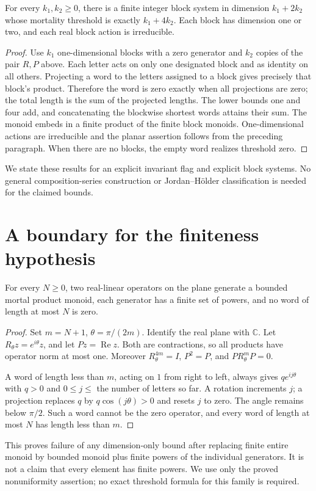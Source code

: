 \begin{proposition}\label{prop:sharpflags}
For every \(k_1,k_2\geq0\), there is a finite integer block system in dimension \(k_1+2k_2\) whose mortality threshold is exactly \(k_1+4k_2\). Each block has dimension one or two, and each real block action is irreducible.
\end{proposition}
\begin{proof}
Use \(k_1\) one-dimensional blocks with a zero generator and \(k_2\) copies of the pair \(R,P\) above. Each letter acts on only one designated block and as identity on all others. Projecting a word to the letters assigned to a block gives precisely that block's product. Therefore the word is zero exactly when all projections are zero; the total length is the sum of the projected lengths. The lower bounds one and four add, and concatenating the blockwise shortest words attains their sum. The monoid embeds in a finite product of the finite block monoids. One-dimensional actions are irreducible and the planar assertion follows from the preceding paragraph. When there are no blocks, the empty word realizes threshold zero.
\end{proof}
We state these results for an explicit invariant flag and explicit block systems. No general composition-series construction or Jordan--H\"older classification is needed for the claimed bounds.

\section{A boundary for the finiteness hypothesis}\label{sec:boundary}
\begin{proposition}\label{prop:boundary}
For every \(N\geq0\), two real-linear operators on the plane generate a bounded mortal product monoid, each generator has a finite set of powers, and no word of length at most \(N\) is zero.
\end{proposition}
\begin{proof}
Set \(m=N+1\), \(\theta=\pi/(2m)\). Identify the real plane with \(\mathbb C\). Let \(R_\theta z=e^{i\theta}z\), and let \(Pz=\operatorname{Re}z\). Both are contractions, so all products have operator norm at most one. Moreover \(R_\theta^{4m}=I\), \(P^2=P\), and \(PR_\theta^mP=0\).

A word of length less than \(m\), acting on \(1\) from right to left, always gives \(q e^{ij\theta}\) with \(q>0\) and \(0\leq j\leq\) the number of letters so far. A rotation increments \(j\); a projection replaces \(q\) by \(q\cos(j\theta)>0\) and resets \(j\) to zero. The angle remains below \(\pi/2\). Such a word cannot be the zero operator, and every word of length at most \(N\) has length less than \(m\).
\end{proof}
This proves failure of any dimension-only bound after replacing finite entire monoid by bounded monoid plus finite powers of the individual generators. It is not a claim that every element has finite powers. We use only the proved nonuniformity assertion; no exact threshold formula for this family is required.

